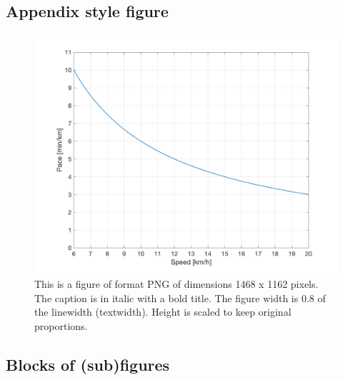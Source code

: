 
\subsection{Appendix style figure}
\begin{figure}[H]
	\centering
	\includegraphics[width=0.8\linewidth]{Figures/PacevsSpeed.png}
	\caption{This is a figure of format PNG of dimensions 1468 x 1162 pixels. The caption is in italic with a bold title. The figure width is 0.8 of the linewidth (textwidth). Height is scaled to keep original proportions.}
	\label{Fig:}
\end{figure}

\lipsum[1]

\subsection{Blocks of (sub)figures}

